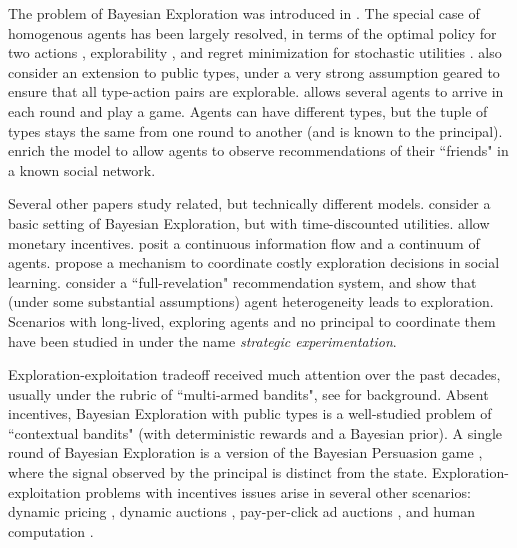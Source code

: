 
The problem of Bayesian Exploration was introduced in \cite{Kremer-JPE14}. The special case of homogenous agents has been largely resolved, in terms of the optimal policy for two actions \cite{Kremer-JPE14}, explorability \cite{ICexplorationGames-ec16}, and regret minimization for stochastic utilities \cite{ICexploration-ec15}. \cite{ICexploration-ec15} also consider an extension to public types, under a very strong assumption geared to ensure that all type-action pairs are explorable. \cite{ICexplorationGames-ec16} allows several agents to arrive in each round and play a game. Agents can have different types, but the tuple of types stays the same from one round to another (and is known to the principal). \cite{Bahar-ec16} enrich the model to allow agents to observe recommendations of their ``friends" in a known social network.

Several other papers study related, but technically different models. \cite{Bimpikis-exploration-ms17} consider a basic setting of Bayesian Exploration, but with time-discounted utilities. \cite{Frazier-ec14} allow monetary incentives. \cite{Che-13} posit a continuous information flow and a continuum of agents. \cite{Bobby-Glen-ec16} propose a mechanism to coordinate costly exploration decisions in social learning. \cite{Sven-aistats18} consider a ``full-revelation" recommendation system, and show that (under some substantial assumptions) agent heterogeneity leads to exploration. Scenarios with long-lived, exploring agents and no principal to coordinate them have been studied in \cite{Bolton-econometrica99,Keller-econometrica05} under the name \emph{strategic experimentation}.

Exploration-exploitation tradeoff received much attention over the past decades, usually under the rubric of ``multi-armed bandits", see  \cite{Bubeck-survey12,Gittins-book11} for background. Absent incentives, Bayesian Exploration with public types is a well-studied problem of ``contextual bandits" (with deterministic rewards and a Bayesian prior). A single round of Bayesian Exploration is a version of the Bayesian Persuasion game \cite{Kamenica-aer11}, where the signal observed by the principal is distinct from the state. Exploration-exploitation problems with incentives issues arise in several other scenarios: dynamic pricing
    \cite{KleinbergL03,BZ09,BwK-focs13},
dynamic auctions
    \cite{AtheySegal-econometrica13,DynPivot-econometrica10,Kakade-pivot-or13},
pay-per-click ad auctions
    \cite{MechMAB-ec09,DevanurK09,Transform-ec10-jacm},
and human computation
    \cite{RepeatedPA-ec14,Ghosh-itcs13,Krause-www13}.


